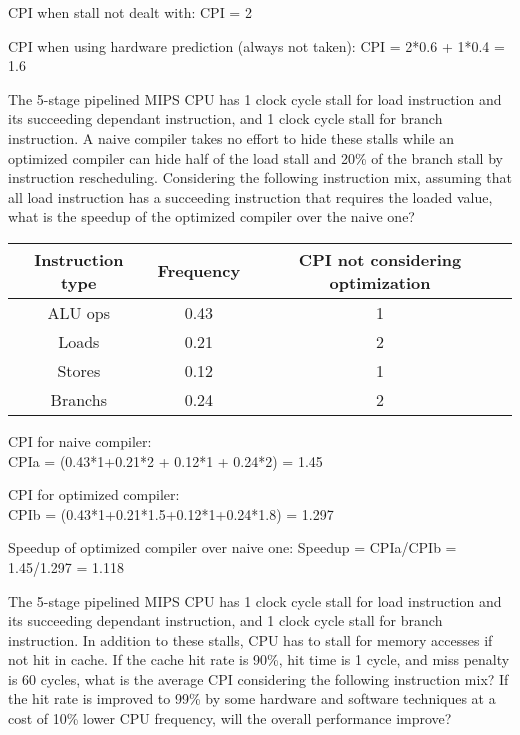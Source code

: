 \documentclass[a4paper, 12pt, addpoints]{exam}
\begin{document}
\begin{questions}
\begin{solution} 
\newpage

CPI when stall not dealt with:
\centering CPI = 2
\raggedright CPI when using hardware prediction (always not taken): 
\centering CPI = 2*0.6 + 1*0.4 = 1.6
\end{solution} 
\newpage


\raggedright

\question[10]
The 5-stage pipelined MIPS CPU has 1 clock cycle stall for load instruction and its succeeding dependant instruction, and 1 clock cycle stall for branch instruction. A naive compiler takes no effort to hide these stalls while an optimized compiler can hide half of the load stall and 20\% of the branch stall by instruction rescheduling. Considering the following instruction mix, assuming that all load instruction has a succeeding instruction that requires the loaded value, what is the speedup of the optimized compiler over the naive one?

\begin{center}
  \begin{tabular}{ | c | c | c | }
    \hline
    Instruction type & Frequency & CPI not considering optimization \\ \hline
    ALU ops & 0.43 & 1 \\ \hline
    Loads & 0.21 & 2 \\ \hline
    Stores & 0.12 & 1 \\ \hline
    Branchs & 0.24 & 2 \\
    \hline
  \end{tabular}
\end{center}


\begin{solution} 
\newpage

CPI for naive compiler:  \\
\centering CPIa = (0.43*1+0.21*2 + 0.12*1 + 0.24*2) = 1.45   \\
\raggedright CPI for optimized compiler: \\
\centering CPIb = (0.43*1+0.21*1.5+0.12*1+0.24*1.8) = 1.297 \\
\raggedright Speedup of optimized compiler over naive one:
\centering Speedup = CPIa/CPIb = 1.45/1.297 = 1.118
\end{solution} 
\newpage


\raggedright

\question[10]
The 5-stage pipelined MIPS CPU has 1 clock cycle stall for load instruction and its succeeding dependant instruction, and 1 clock cycle stall for branch instruction. In addition to these stalls, CPU has to stall for memory accesses if not hit in cache. If the cache hit rate is 90\%, hit time is 1 cycle, and miss penalty is 60 cycles, what is the average CPI considering the following instruction mix? If the hit rate is improved to 99\% by some hardware and software techniques at a cost of 10\% lower CPU frequency, will the overall performance improve?


\end{questions}
\end{document}
